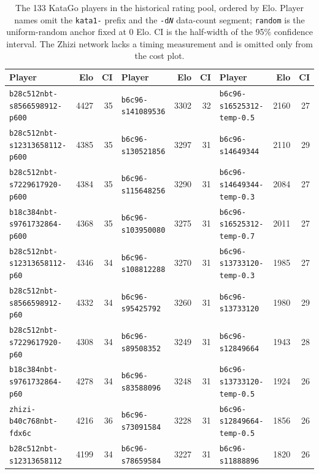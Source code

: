 \documentclass{article}
\begin{document}
\begin{table}[htbp]
  \caption{The 133 KataGo players in the historical rating pool, ordered by Elo. Player
  names omit the \texttt{kata1-} prefix and the \texttt{-d\textit{N}} data-count
  segment; \texttt{random} is the uniform-random anchor fixed at 0 Elo. CI is the
  half-width of the 95\% confidence interval. The Zhizi network lacks a timing
  measurement and is omitted only from the cost plot.}
  \label{tab:katago-players}
  \centering
  \scriptsize
  \setlength{\tabcolsep}{2.5pt}
  \begin{tabular}{@{}lrr@{\hspace{14pt}}lrr@{\hspace{14pt}}lrr@{}}
    \toprule
    Player & Elo & CI & Player & Elo & CI & Player & Elo & CI \\
    \midrule
    \texttt{b28c512nbt-s8566598912-p600} & 4427 & 35 & \texttt{b6c96-s141089536} & 3302 & 32 & \texttt{b6c96-s16525312-temp-0.5} & 2160 & 27 \\
    \texttt{b28c512nbt-s12313658112-p600} & 4385 & 35 & \texttt{b6c96-s130521856} & 3297 & 31 & \texttt{b6c96-s14649344} & 2110 & 29 \\
    \texttt{b28c512nbt-s7229617920-p600} & 4384 & 35 & \texttt{b6c96-s115648256} & 3290 & 31 & \texttt{b6c96-s14649344-temp-0.3} & 2084 & 27 \\
    \texttt{b18c384nbt-s9761732864-p600} & 4368 & 35 & \texttt{b6c96-s103950080} & 3275 & 31 & \texttt{b6c96-s16525312-temp-0.7} & 2011 & 27 \\
    \texttt{b28c512nbt-s12313658112-p60} & 4346 & 34 & \texttt{b6c96-s108812288} & 3270 & 31 & \texttt{b6c96-s13733120-temp-0.3} & 1985 & 27 \\
    \texttt{b28c512nbt-s8566598912-p60} & 4332 & 34 & \texttt{b6c96-s95425792} & 3260 & 31 & \texttt{b6c96-s13733120} & 1980 & 29 \\
    \texttt{b28c512nbt-s7229617920-p60} & 4308 & 34 & \texttt{b6c96-s89508352} & 3249 & 31 & \texttt{b6c96-s12849664} & 1943 & 28 \\
    \texttt{b18c384nbt-s9761732864-p60} & 4278 & 34 & \texttt{b6c96-s83588096} & 3248 & 31 & \texttt{b6c96-s13733120-temp-0.5} & 1924 & 26 \\
    \texttt{zhizi-b40c768nbt-fdx6c} & 4216 & 36 & \texttt{b6c96-s73091584} & 3228 & 31 & \texttt{b6c96-s12849664-temp-0.5} & 1856 & 26 \\
    \texttt{b28c512nbt-s12313658112} & 4199 & 34 & \texttt{b6c96-s78659584} & 3227 & 31 & \texttt{b6c96-s11888896} & 1820 & 26 \\

\end{tabular}
\end{table}
\end{document}
